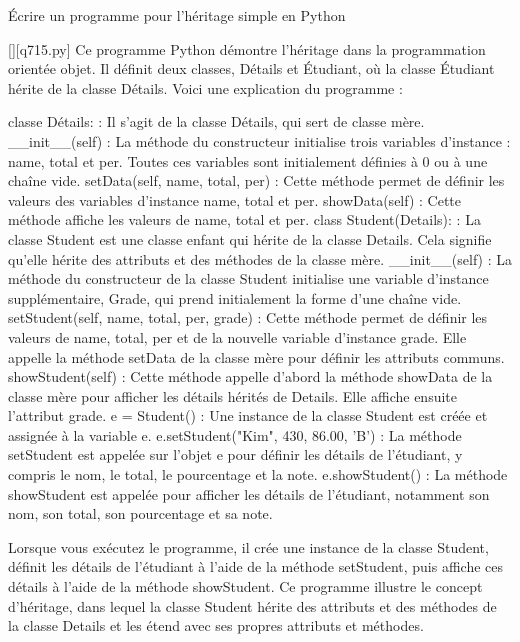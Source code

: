         \question
        Écrire un programme pour l'héritage simple en Python
        \par
        \begin{solution}
            \renewcommand{\nomfichier}{q715.py}
            \pythonfile{\chemincode \nomfichier}[][\nomfichier]
            Ce programme Python démontre l'héritage dans la programmation orientée objet. Il définit deux classes, Détails et Étudiant, où la classe Étudiant hérite de la classe Détails. Voici une explication du programme :

    classe Détails: : Il s'agit de la classe Détails, qui sert de classe mère.
        \_\_init\_\_(self) : La méthode du constructeur initialise trois variables d'instance : name, total et per. Toutes ces variables sont initialement définies à 0 ou à une chaîne vide.
        setData(self, name, total, per) : Cette méthode permet de définir les valeurs des variables d'instance name, total et per.
        showData(self) : Cette méthode affiche les valeurs de name, total et per.
    class Student(Details): : La classe Student est une classe enfant qui hérite de la classe Details. Cela signifie qu'elle hérite des attributs et des méthodes de la classe mère.
        \_\_init\_\_(self) : La méthode du constructeur de la classe Student initialise une variable d'instance supplémentaire, Grade, qui prend initialement la forme d'une chaîne vide.
        setStudent(self, name, total, per, grade) : Cette méthode permet de définir les valeurs de name, total, per et de la nouvelle variable d'instance grade. Elle appelle la méthode setData de la classe mère pour définir les attributs communs.
        showStudent(self) : Cette méthode appelle d'abord la méthode showData de la classe mère pour afficher les détails hérités de Details. Elle affiche ensuite l'attribut grade.
    e = Student() : Une instance de la classe Student est créée et assignée à la variable e.
    e.setStudent("Kim", 430, 86.00, 'B') : La méthode setStudent est appelée sur l'objet e pour définir les détails de l'étudiant, y compris le nom, le total, le pourcentage et la note.
    e.showStudent() : La méthode showStudent est appelée pour afficher les détails de l'étudiant, notamment son nom, son total, son pourcentage et sa note.

Lorsque vous exécutez le programme, il crée une instance de la classe Student, définit les détails de l'étudiant à l'aide de la méthode setStudent, puis affiche ces détails à l'aide de la méthode showStudent. Ce programme illustre le concept d'héritage, dans lequel la classe Student hérite des attributs et des méthodes de la classe Details et les étend avec ses propres attributs et méthodes.
        \end{solution}
        

